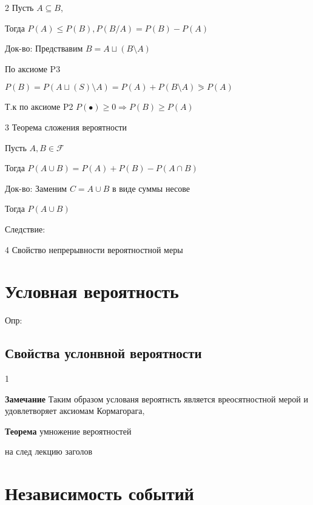 \documentclass{article}
\begin{document}
2 Пусть $A \subseteq B $,

Тогда $P(A) \leqslant P(B), P(B/A) = P(B) - P(A)$

Док-во: Предствавим $B=A \sqcup (B \setminus  A)$

По аксиоме P3

$P(B) = P(A \sqcup (S) \setminus A ) = P(A)+P(B \setminus A) \eqslantgtr P(A)$

Т.к по аксиоме P2 $P(\bullet ) \geq 0 \Rightarrow P(B) \geq P(A)$

\vspace{5mm}

3 Теорема сложения вероятности

Пусть  $A,B \in \mathcal{F}$

Тогда $P(A\cup B) = P(A) + P(B) - P(A \cap  B)$

Док-во: Заменим $C = A \cup  B$ в виде суммы несове

Тогда $P(A\cup B) $

Следствие:

\vspace{5mm}

4 Свойство непрерывности вероятностной меры



\vspace{5mm}


\section{Условная вероятность}




Опр:




\subsection{Свойства услонвной вероятности}

1 




\textbf{Замечание} Таким образом услованя вероятнсть является вреосятностной мерой 
и удовлетворяет аксиомам Кормагорага,



\textbf{Теорема} умножение вероятностей


на след лекцию заголов

\section{Независимость событий}
\end{document}
